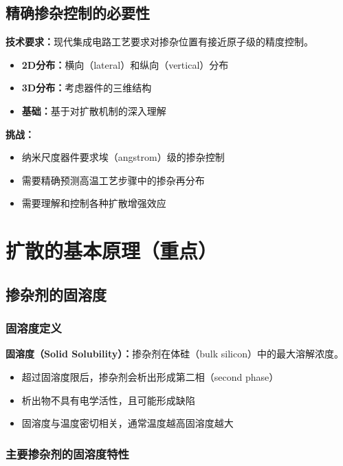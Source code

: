 \documentclass[UTF8,12pt,a4paper]{ctexart}
\begin{document}
\subsection{精确掺杂控制的必要性}

\textbf{技术要求：}现代集成电路工艺要求对掺杂位置有接近原子级的精度控制。

\begin{itemize}
    \item \textbf{2D分布：}横向（lateral）和纵向（vertical）分布
    \item \textbf{3D分布：}考虑器件的三维结构
    \item \textbf{基础：}基于对扩散机制的深入理解
\end{itemize}

\textbf{挑战：}
\begin{itemize}
    \item 纳米尺度器件要求埃（angstrom）级的掺杂控制
    \item 需要精确预测高温工艺步骤中的掺杂再分布
    \item 需要理解和控制各种扩散增强效应
\end{itemize}
\newpage
\section{扩散的基本原理（重点）}

\subsection{掺杂剂的固溶度}

\subsubsection{固溶度定义}

\textbf{固溶度（Solid Solubility）：}掺杂剂在体硅（bulk silicon）中的最大溶解浓度。

\begin{itemize}
    \item 超过固溶度限后，掺杂剂会析出形成第二相（second phase）
    \item 析出物不具有电学活性，且可能形成缺陷
    \item 固溶度与温度密切相关，通常温度越高固溶度越大
\end{itemize}

\subsubsection{主要掺杂剂的固溶度特性}
\end{document}
